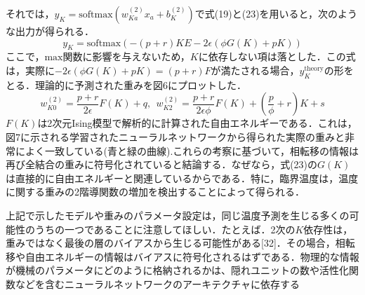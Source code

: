 \documentclass[a4paper,11pt]{jsreport}
\begin{document}
それでは，$y_K = \text{softmax}(w_{Ka}^{(2)}x_a + b_K^{(2)})$で式(19)と(23)を用いると，次のような出力が得られる．
\begin{equation}
  y_K = \text{softmax}(-(p+r)KE - 2\epsilon(\phi G(K) + pK))
\end{equation}
ここで，$\text{max}$関数に影響を与えないため，$K$に依存しない項は落とした．この式は，実際に$-2\epsilon (\phi G(K) + pK) = (p + r)F$が満たされる場合，$y_K^{\text{theory}}$の形をとる．理論的に予測された重みを図6にプロットした．
\begin{equation}
  w_{K0}^{(2)} = \frac{p+r}{2\epsilon}F(K) + q, \ \
  w_{K2}^{(2)} = \frac{p+r}{2\epsilon \phi}F(K) + \left( \frac{p}{\phi} + r \right)K + s
\end{equation}
$F(K)$は2次元Ising模型で解析的に計算された自由エネルギーである．これは，図7に示される学習されたニューラルネットワークから得られた実際の重みと非常によく一致している(青と緑の曲線).これらの考察に基づいて，相転移の情報は再び全結合の重みに符号化されていると結論する．なぜなら，式(23)の$G(K)$は直接的に自由エネルギーと関連しているからである．特に，臨界温度は，温度に関する重みの2階導関数の増加を検出することによって得られる．\par
上記で示したモデルや重みのパラメータ設定は，同じ温度予測を生じる多くの可能性のうちの一つであることに注意してほしい．たとえば．2次の$K$依存性は，重みではなく最後の層のバイアスから生じる可能性がある[32]．その場合，相転移や自由エネルギーの情報はバイアスに符号化されるはずである．物理的な情報が機械のパラメータにどのように格納されるかは、隠れユニットの数や活性化関数などを含むニューラルネットワークのアーキテクチャに依存する\par
\end{document}
